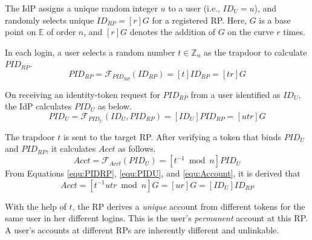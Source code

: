 The IdP assigns a unique random integer $u$ to a user (i.e., $ID_U = u$),
 and randomly selects unique $ID_{RP} = [r]G$ for a registered RP. %
Here, $G$ is a base point on $\mathbb{E}$ of order $n$, and $[r]G$ denotes the addition of $G$ on the curve $r$ times.


 In each login, a user selects a random number $t \in \mathbb{Z}_n$ as the trapdoor to calculate $PID_{RP}$.
\begin{equation}
PID_{RP} = \mathcal{F}_{PID_{RP}}(ID_{RP}) = [t]{ID_{RP}} = [tr]G
\label{equ:PIDRP}
\end{equation}



On receiving an identity-token request for $PID_{RP}$ from a user identified as $ID_U$, the IdP calculates $PID_{U}$ as below.
\begin{equation}
PID_{U} = \mathcal{F}_{PID_U}(ID_U, PID_{RP}) =
  [{ID_U}]{PID_{RP}} = [utr]G
 \label{equ:PIDU}
\end{equation}


The trapdoor $t$ is sent to the target RP. %
After verifying a token that binds $PID_U$ and $PID_{RP}$, it calculates $Acct$ as follows.
\begin{equation}
Acct = \mathcal{F}_{Acct}(PID_{U})
   = [t^{-1} \bmod n]PID_{U}
   \label{equ:Account}
\end{equation}
From Equations \ref{equ:PIDRP}, \ref{equ:PIDU}, and \ref{equ:Account}, it is derived that
\begin{equation}
   Acct =  [t^{-1}utr \bmod n]G = [ur]G = [ID_U]ID_{RP}
   \label{equ:AccountNotChanged}
\end{equation}


With the help of $t$, the RP derives a \emph{unique} account from different tokens for the same user in her different logins. This is the user's \emph{permanent} account at this RP.
A user's accounts at different RPs are inherently different and unlinkable.

